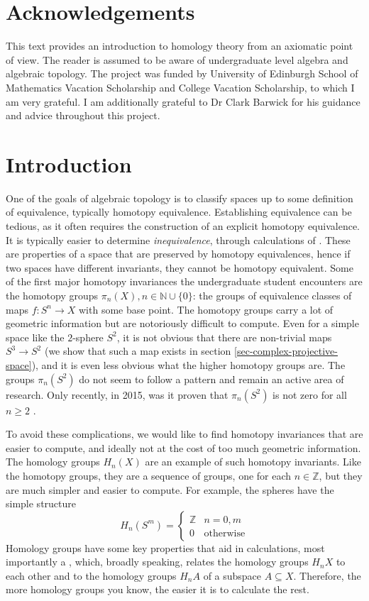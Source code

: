 \section{Acknowledgements}
This text provides an introduction to homology theory from an axiomatic point of view. The reader is assumed to be aware of undergraduate level algebra and algebraic topology. The project was funded by University of Edinburgh School of Mathematics Vacation Scholarship and College Vacation Scholarship, to which I am very grateful. I am additionally grateful to Dr Clark Barwick for his guidance and advice throughout this project.
\section{Introduction}
One of the goals of algebraic topology is to classify spaces up to some definition of equivalence, typically homotopy equivalence. Establishing equivalence can be tedious, as it often requires the construction of an explicit homotopy equivalence. It is typically easier to determine \textit{inequivalence}, through calculations of . These are properties of a space that are preserved by homotopy equivalences, hence if two spaces have different invariants, they cannot be homotopy equivalent. Some of the first major homotopy invariances the undergraduate student encounters are the homotopy groups $\pi_n(X),n\in \mathbb{N}\cup \{0\}$: the groups of equivalence classes of maps $f:S^{n}\rightarrow X$ with some base point. The homotopy groups carry a lot of geometric information but are notoriously difficult to compute. Even for a simple space like the $2$-sphere $S^2$, it is not obvious that there are non-trivial maps $S^3\rightarrow S^2$ (we show that such a map exists in section \ref{sec-complex-projective-space}), and it is even less obvious what the higher homotopy groups are. The groups $\pi_n(S^2)$ do not seem to follow a pattern and remain an active area of research. Only recently, in 2015, was it proven that $\pi_n(S^2)$ is not zero for all $n\geq 2$ \cite{Ivanov}.

To avoid these complications, we would like to find homotopy invariances that are easier to compute, and ideally not at the cost of too much geometric information. The homology groups $H_n(X)$ are an example of such homotopy invariants. Like the homotopy groups, they are a sequence of groups, one for each $n\in \mathbb{Z}$, but they are much simpler and easier to compute. For example, the spheres have the simple structure $$H_n(S^m)=\begin{cases}\mathbb{Z} & n=0,m\\ 0 & \text{otherwise}\end{cases}$$ 
Homology groups have some key properties that aid in calculations, most importantly a , which, broadly speaking, relates the homology groups $H_nX$ to each other and to the homology groups $H_nA$ of a subspace $A\subseteq X$. Therefore, the more homology groups you know, the easier it is to calculate the rest.

